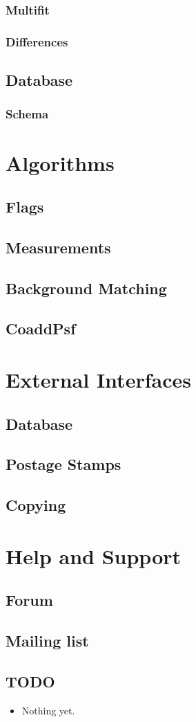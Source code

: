\documentclass[12pt]{article}
\begin{document}
\subsubsection{Multifit}
\subsubsection{Differences}
\subsection{Database}
\subsubsection{Schema}

\section{Algorithms}
\label{sec:algorithms}
\subsection{Flags}
\subsection{Measurements}
\subsection{Background Matching}
\subsection{CoaddPsf}

\section{External Interfaces}
\label{sec:interfaces}
\subsection{Database}
\subsection{Postage Stamps}
\subsection{Copying}

\section{Help and Support}
\label{sec:support}
\subsection{Forum}
\subsection{Mailing list}


\begin{todo}
\clearpage
\section{TODO}
\begin{itemize}
\item Nothing yet.
\end{itemize}
\end{todo}
\end{document}
